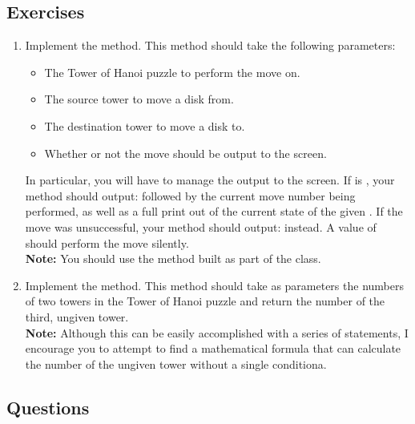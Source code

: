 		\subsection{Exercises}
		 \begin{enumerate}
		 	\item Implement the  method. This method should take the following parameters:
				\begin{itemize}[label=>]
					\item {} The Tower of Hanoi puzzle to perform the move on.
					\item {} The source tower to move a disk from.
					\item {} The destination tower to move a disk to.
					\item {} Whether or not the move should be output to the screen.
				\end{itemize}
				In particular, you will have to manage the output to the screen. If  is , your method should output:  followed by the current move number being performed, as well as a full print out of the current state of the given . If the move was unsuccessful, your method should output:  instead. A  value of  should perform the move silently.\\
				{\small\textbf{Note:} You should use the  method built as part of the  class.}

			\item Implement the  method. This method should take as parameters the numbers of two towers in the Tower of Hanoi puzzle and return the number of the third, ungiven tower.\\
			{\small\textbf{Note:} Although this can be easily accomplished with a series of  statements, I encourage you to attempt to find a mathematical formula that can calculate the number of the ungiven tower without a single conditiona.}
		 \end{enumerate}

		\subsection{Questions}
			\ \\[9pt]
	\pagebreak

